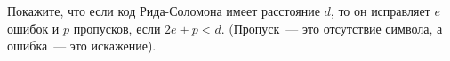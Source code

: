Покажите, что если код Рида-Соломона имеет расстояние $d$, то он исправляет $e$ ошибок и $p$ пропусков, если $2e + p <
d$. (Пропуск~--- это отсутствие символа, а ошибка~--- это искажение).